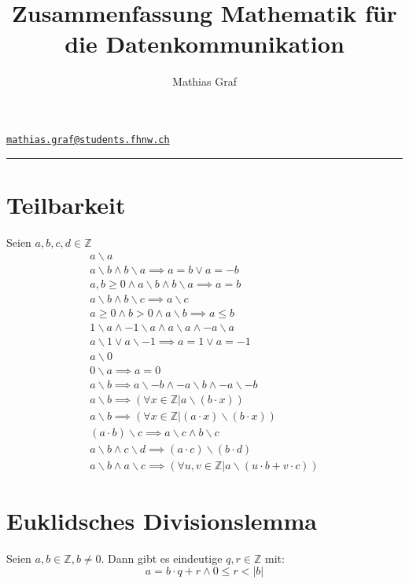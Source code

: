 \documentclass[a4paper, ngerman, landscape, fleqn]{article}
\title{Zusammenfassung Mathematik für die Datenkommunikation}
\author{Mathias Graf}
\makeatletter
\def\email{\href{mailto:mathias.graf@students.fhnw.ch}{\texttt{mathias.graf@students.fhnw.ch}}}
\makeatother
\begin{document}
\makeatletter
{\Large \textbf{\@title}}
\hfill
{\@author}
\hfill
\email
\makeatother
\hrule

\begin{multicols*}{3}

\section*{Teilbarkeit}
Seien $a, b, c, d \in \mathbb{Z}$
\begin{align*}
    a \backslash a \\
    a \backslash b \wedge b \backslash a \implies a = b \vee a = -b \\
    a, b \geq 0 \wedge a \backslash b \wedge b \backslash a \implies a = b \\
    a \backslash b \wedge b \backslash c \implies a \backslash c \\
    a \geq 0 \wedge b > 0 \wedge a \backslash b \implies a \leq b \\
    1 \backslash a \wedge -1 \backslash a \wedge a \backslash a \wedge -a \backslash a \\
    a \backslash 1 \vee a \backslash -1 \implies a = 1 \vee a = -1 \\
    a \backslash 0 \\
    0 \backslash a \implies a = 0 \\
    a \backslash b \implies a \backslash -b \wedge -a \backslash b \wedge -a \backslash -b \\
    a \backslash b \implies (\forall x \in \mathbb{Z} | a \backslash (b \cdot x)) \\
    a \backslash b \implies (\forall x \in \mathbb{Z} | (a \cdot x) \backslash (b \cdot x)) \\
    (a \cdot b) \backslash c \implies a \backslash c  \wedge b \backslash c \\
    a \backslash b \wedge c \backslash d \implies (a \cdot c) \backslash (b \cdot d) \\
    a \backslash b \wedge a \backslash c \implies (\forall u, v \in \mathbb{Z} | a \backslash (u \cdot b + v \cdot c))
\end{align*}

\section*{Euklidsches Divisionslemma}
Seien $a, b \in \mathbb{Z}, b \neq 0$. Dann gibt es eindeutige $q, r \in \mathbb{Z}$ mit:
\begin{equation*}
    a = b \cdot q + r \wedge 0 \leq r < | b | 
\end{equation*}


\end{multicols*}
\end{document}
